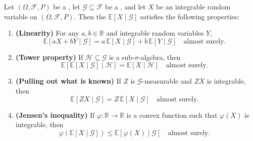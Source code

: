 \begin{proposition} \label{proposition:properties_of_conditional_expectation}
Let $(\Omega, \mathcal{F}, P)$ be a , let $\mathcal{G} \subseteq \mathcal{F}$ be a , and let $X$ be an integrable random variable on $(\Omega, \mathcal{F}, P)$. Then the  $\mathbb{E}[X \mid \mathcal{G}]$ satisfies the following properties:

\begin{enumerate}
    \item \textbf{(Linearity)} For any $a, b \in \mathbb{R}$ and integrable random variables $Y$,
    $$\mathbb{E}[aX + bY \mid \mathcal{G}] = a\,\mathbb{E}[X \mid \mathcal{G}] + b\,\mathbb{E}[Y \mid \mathcal{G}] \quad \text{almost surely.}$$

    \item \textbf{(Tower property)} If $\mathcal{H} \subseteq \mathcal{G}$ is a sub-$\sigma$-algebra, then
    $$\mathbb{E}[\mathbb{E}[X \mid \mathcal{G}] \mid \mathcal{H}] = \mathbb{E}[X \mid \mathcal{H}] \quad \text{almost surely.}$$

    \item \textbf{(Pulling out what is known)} If $Z$ is $\mathcal{G}$-measurable and $ZX$ is integrable, then
    $$\mathbb{E}[ZX \mid \mathcal{G}] = Z\,\mathbb{E}[X \mid \mathcal{G}] \quad \text{almost surely.}$$

    \item \textbf{(Jensen's inequality)} If $\varphi: \mathbb{R} \to \mathbb{R}$ is a convex function such that $\varphi(X)$ is integrable, then
    $$\varphi(\mathbb{E}[X \mid \mathcal{G}]) \leq \mathbb{E}[\varphi(X) \mid \mathcal{G}] \quad \text{almost surely.}$$
\end{enumerate}
\end{proposition}
